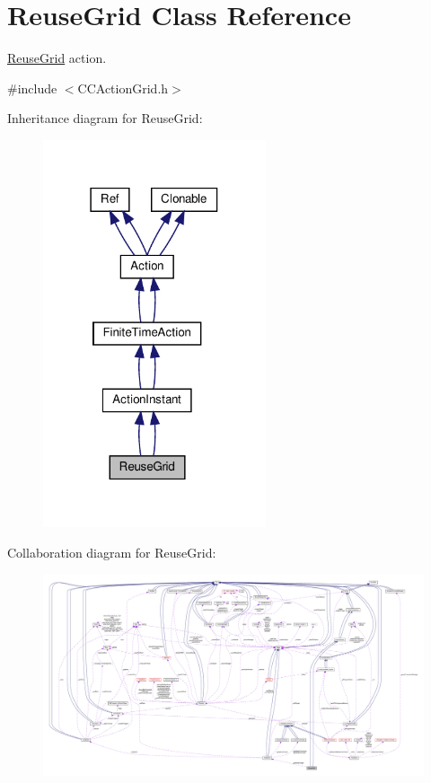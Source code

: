 \hypertarget{classReuseGrid}{}\section{Reuse\+Grid Class Reference}
\label{classReuseGrid}


\hyperlink{classReuseGrid}{Reuse\+Grid} action.  




{\ttfamily \#include $<$C\+C\+Action\+Grid.\+h$>$}



Inheritance diagram for Reuse\+Grid\+:
\nopagebreak
\begin{figure}[H]
\begin{center}
\leavevmode
\includegraphics[width=186pt]{classReuseGrid__inherit__graph}
\end{center}
\end{figure}


Collaboration diagram for Reuse\+Grid\+:
\nopagebreak
\begin{figure}[H]
\begin{center}
\leavevmode
\includegraphics[width=350pt]{classReuseGrid__coll__graph}
\end{center}
\end{figure}

